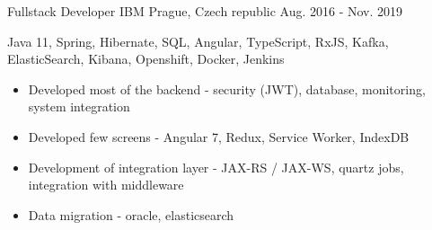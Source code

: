 \begin{cventries}
    \cventry
    {Fullstack Developer} %
    {IBM} %
    {Prague,  Czech republic} %
    {Aug. 2016 - Nov. 2019} %
    {
        \hspace{15pt} \faHammer Java 11, Spring, Hibernate, SQL, Angular, TypeScript, RxJS, Kafka, ElasticSearch, Kibana, Openshift, Docker, Jenkins
        \begin{itemize}
            \item {Developed most of the backend - security (JWT), database, monitoring, system integration}
            \item {Developed few screens - Angular 7, Redux, Service Worker, IndexDB}
            \item {Development of integration layer - JAX-RS / JAX-WS, quartz jobs, integration with middleware}
            \item {Data migration - oracle, elasticsearch}
        \end{itemize}
    }
\end{cventries}
